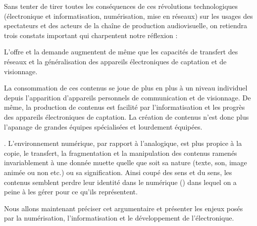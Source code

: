 Sans tenter de tirer toutes les conséquences de ces révolutions technologiques (électronique et informatisation, numérisation, mise en réseaux) sur les usages des spectateurs et des acteurs de la chaîne de production audiovisuelle, on retiendra trois constats important qui charpentent notre réflexion : 
\begin{liste}
	\item {}
	L'offre et la demande augmentent de même que les capacités de transfert des réseaux et la généralisation des appareils électroniques de captation et de visionnage.

	\item {}
	La consommation de ces contenus se joue de plus en plus à un niveau individuel depuis l'apparition d'appareils personnels de communication et de visionnage. 
	De même, la production de contenus est facilité par l'informatisation et les progrès des appareils électroniques de captation. 
	La création de contenus n'est donc plus l'apanage de grandes équipes spécialisées et lourdement équipées.
	
	\item {}. 
	L'environnement numérique, par rapport à l'analogique, est plus propice à la copie, le transfert, la fragmentation et la manipulation des contenus ramenés invariablement à une donnée muette quelle que soit sa nature (texte, son, image animée ou non etc.) ou sa signification.
	Ainsi coupé des sens et du sens, les contenus semblent perdre leur identité dans le  numérique (\cite[p.~13]{Bachimont2000}) dans lequel on a peine à les gérer pour ce qu'ils représentent. 	


\end{liste} 

Nous allons maintenant préciser cet argumentaire et présenter les enjeux posés par la numérisation, l'informatisation et le développement de l'électronique.




